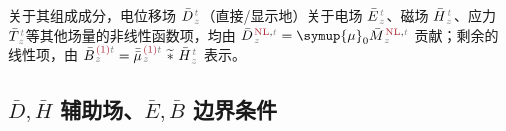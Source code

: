 关于其组成成分，电位移场 $\bar{D}^{\;\!\textcolor{gray}{t}}_{\;\!\textcolor{gray}{z}}$（直接/显示地）关于电场 $\bar{E}^{\;\!\textcolor{gray}{t}}_{\;\!\textcolor{gray}{z}}$、磁场 $\bar{H}^{\;\!\textcolor{gray}{t}}_{\;\!\textcolor{gray}{z}}$、应力 $\bar{T}^{\;\!\textcolor{gray}{t}}_{\;\!\textcolor{gray}{z}}$等其他场量的非线性函数项，均由 $\bar{D}^{\;\!\textcolor{Maroon}{\text{NL}}, \textcolor{gray}{t}}_{\;\!\textcolor{gray}{z}} = {\symup{\mu}}_0 \bar{M}^{\;\!\textcolor{Maroon}{\text{NL}}, \textcolor{gray}{t}}_{\;\!\textcolor{gray}{z}}$ 贡献；剩余的线性项，由 $\bar{B}^{\;\!\textcolor{Maroon}{\text{(1)}} \textcolor{gray}{t}}_{\;\!\textcolor{gray}{z}} = \bar{\bar{\mu}}^{\;\!\textcolor{Maroon}{\text{(1)}} \textcolor{gray}{t}}_{\;\!\textcolor{gray}{z}}~\widetilde *~\bar{H}^{\;\!\textcolor{gray}{t}}_{\;\!\textcolor{gray}{z}}$ 表示。

\subsection{$\bar{D},\bar{H}$ 辅助场、$\bar{E},\bar{B}$ 边界条件}\label{ssec:dh}
